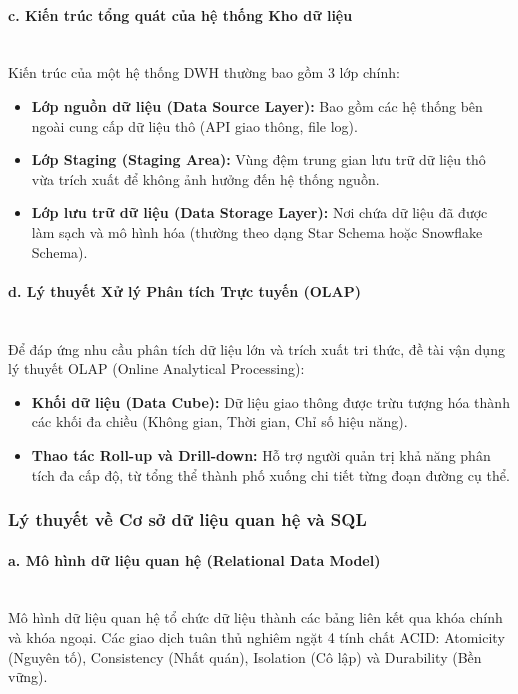 \paragraph{c. Kiến trúc tổng quát của hệ thống Kho dữ liệu} \mbox{} \\
Kiến trúc của một hệ thống DWH thường bao gồm 3 lớp chính:
\begin{itemize}
    \item \textbf{Lớp nguồn dữ liệu (Data Source Layer):} Bao gồm các hệ thống bên ngoài cung cấp dữ liệu thô (API giao thông, file log).
    \item \textbf{Lớp Staging (Staging Area):} Vùng đệm trung gian lưu trữ dữ liệu thô vừa trích xuất để không ảnh hưởng đến hệ thống nguồn.
    \item \textbf{Lớp lưu trữ dữ liệu (Data Storage Layer):} Nơi chứa dữ liệu đã được làm sạch và mô hình hóa (thường theo dạng Star Schema hoặc Snowflake Schema).
\end{itemize}

\paragraph{d. Lý thuyết Xử lý Phân tích Trực tuyến (OLAP)} \mbox{} \\
Để đáp ứng nhu cầu phân tích dữ liệu lớn và trích xuất tri thức, đề tài vận dụng lý thuyết OLAP (Online Analytical Processing):
\begin{itemize}
    \item \textbf{Khối dữ liệu (Data Cube):} Dữ liệu giao thông được trừu tượng hóa thành các khối đa chiều (Không gian, Thời gian, Chỉ số hiệu năng).
    \item \textbf{Thao tác Roll-up và Drill-down:} Hỗ trợ người quản trị khả năng phân tích đa cấp độ, từ tổng thể thành phố xuống chi tiết từng đoạn đường cụ thể.
\end{itemize}

\subsubsection{Lý thuyết về Cơ sở dữ liệu quan hệ và SQL}

\paragraph{a. Mô hình dữ liệu quan hệ (Relational Data Model)} \mbox{} \\
Mô hình dữ liệu quan hệ tổ chức dữ liệu thành các bảng liên kết qua khóa chính và khóa ngoại. Các giao dịch tuân thủ nghiêm ngặt 4 tính chất ACID: Atomicity (Nguyên tố), Consistency (Nhất quán), Isolation (Cô lập) và Durability (Bền vững).

